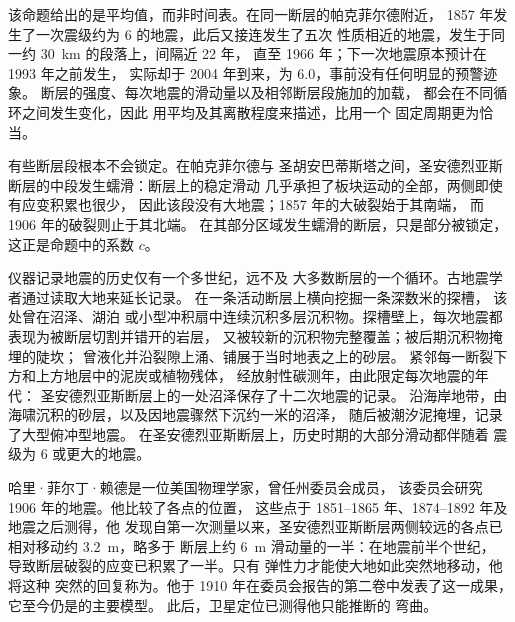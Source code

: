 该命题给出的是平均值，而非时间表。在同一断层的帕克菲尔德附近，
1857 年发生了一次震级约为 6 的地震，此后又接连发生了五次
性质相近的地震，发生于同一约 \qty{30}{km} 的段落上，间隔近 22 年，
直至 1966 年；下一次地震原本预计在 1993 年之前发生，
实际却于 2004 年到来，为 6.0，事前没有任何明显的预警迹象。
断层的强度、每次地震的滑动量以及相邻断层段施加的加载，
都会在不同循环之间发生变化，因此
用平均及其离散程度来描述，比用一个
固定周期更为恰当。

有些断层段根本不会锁定。在帕克菲尔德与
圣胡安巴蒂斯塔之间，圣安德烈亚斯断层的中段发生蠕滑：断层上的稳定滑动
几乎承担了板块运动的全部，两侧即使有应变积累也很少，
因此该段没有大地震；1857 年的大破裂始于其南端，
而 1906 年的破裂则止于其北端。
在其部分区域发生蠕滑的断层，只是部分被锁定，
这正是命题中的系数 $c$。

\begin{inthefield}[通过探槽读取过去的地震]
仪器记录地震的历史仅有一个多世纪，远不及
大多数断层的一个循环。古地震学者通过读取大地来延长记录。
在一条活动断层上横向挖掘一条深数米的探槽，
该处曾在沼泽、湖泊
或小型冲积扇中连续沉积多层沉积物。探槽壁上，每次地震都表现为被断层切割并错开的岩层，
又被较新的沉积物完整覆盖；被后期沉积物掩埋的陡坎；
曾液化并沿裂隙上涌、铺展于当时地表之上的砂层。
紧邻每一断裂下方和上方地层中的泥炭或植物残体，
经放射性碳测年，由此限定每次地震的年代：
圣安德烈亚斯断层上的一处沼泽保存了十二次地震的记录。
沿海岸地带，由海啸沉积的砂层，以及因地震骤然下沉约一米的沼泽，
随后被潮汐泥掩埋，记录了大型俯冲型地震。
在圣安德烈亚斯断层上，历史时期的大部分滑动都伴随着
震级为 6 或更大的地震。
\end{inthefield}

\begin{history}
哈里·菲尔丁·赖德是一位美国物理学家，曾任州委员会成员，
该委员会研究 1906 年的地震。他比较了各点的位置，
这些点于 1851--1865 年、1874--1892 年及地震之后测得，他
发现自第一次测量以来，圣安德烈亚斯断层两侧较远的各点已
相对移动约 \qty{3.2}{m}，略多于
断层上约 \qty{6}{m} 滑动量的一半：在地震前半个世纪，
导致断层破裂的应变已积累了一半。只有
弹性力才能使大地如此突然地移动，他将这种
突然的回复称为。他于 1910 年在委员会报告的第二卷中发表了这一成果，
它至今仍是的主要模型。
此后，卫星定位已测得他只能推断的
弯曲。
\end{history}

